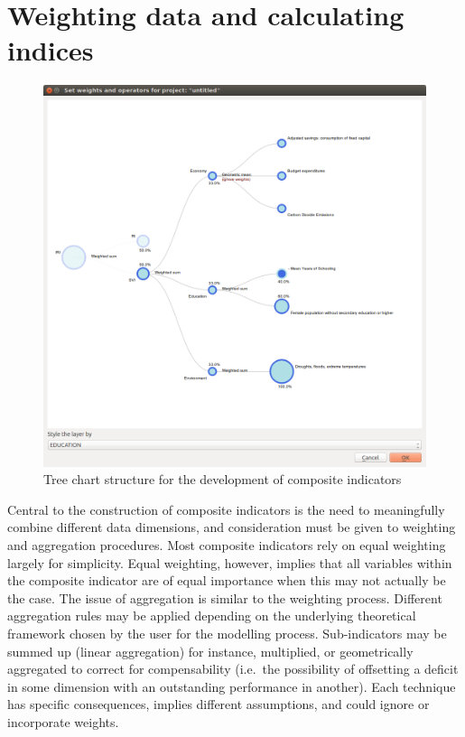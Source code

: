 \chapter{Weighting data and calculating indices}
\label{chap:weighting_and_calculating}

\begin{figure}
    \centering
    \includegraphics[width=\textwidth]{../images/image06}
    \caption{Tree chart structure for the development of composite indicators}
    \label{fig:weighting_and_calculating}
\end{figure}

Central to the construction of composite indicators is the need to meaningfully
combine different data dimensions, and consideration must be given to weighting
and aggregation procedures. Most composite indicators rely on equal weighting
largely for simplicity. Equal weighting, however, implies that all variables
within the composite indicator are of equal importance when this may not
actually be the case. The issue of aggregation is similar to the weighting
process. Different aggregation rules may be applied depending on the underlying
theoretical framework chosen by the user for the modelling process.
Sub-indicators may be summed up (linear aggregation) for instance, multiplied,
or geometrically aggregated to correct for compensability (i.e.\ the possibility
of offsetting a deficit in some dimension with an outstanding performance in
another). Each technique has specific consequences, implies different
assumptions, and could ignore or incorporate weights.

